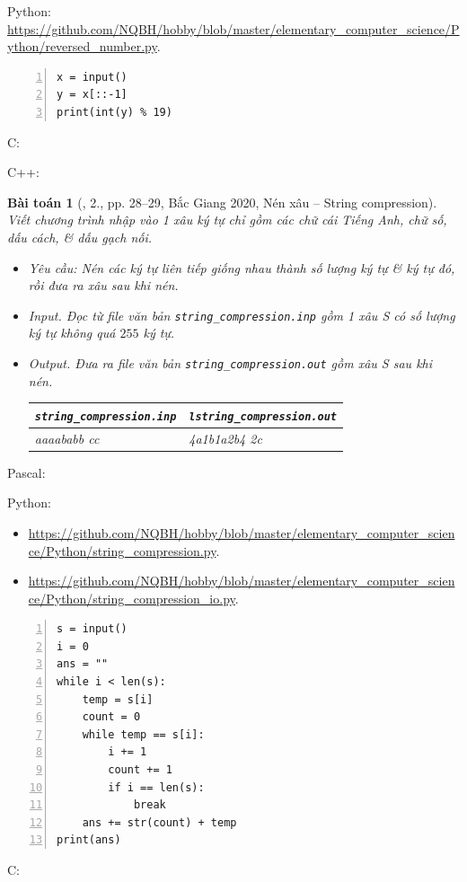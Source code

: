\documentclass{article}
\newtheorem{baitoan}{Bài toán}
\begin{document}
Python: \url{https://github.com/NQBH/hobby/blob/master/elementary_computer_science/Python/reversed_number.py}.
\begin{Verbatim}[numbers=left,xleftmargin=5mm]
x = input()
y = x[::-1]
print(int(y) % 19)
\end{Verbatim}
C:

C++:

\begin{baitoan}[\cite{VietSTEM2021}, 2., pp. 28--29, Bắc Giang 2020, Nén xâu -- String compression]
	Viết chương trình nhập vào 1 xâu ký tự chỉ gồm các chữ cái Tiếng Anh, chữ số, dấu cách, \& dấu gạch nối.
	\begin{itemize}
		\item {\sf Yêu cầu:} Nén các ký tự liên tiếp giống nhau thành số lượng ký tự \& ký tự đó, rồi đưa ra xâu sau khi nén.
		\item {\sf Input.} Đọc từ file văn bản \verb|string_compression.inp| gồm 1 xâu S có số lượng ký tự không quá $255$ ký tự.
		\item {\sf Output.} Đưa ra file văn bản \verb|string_compression.out| gồm xâu S sau khi nén.
		\begin{table}[H]
			\centering
			\begin{tabular}{|l|l|}
				\hline
				\verb|string_compression.inp| & \verb|lstring_compression.out| \\
				\hline
				aaaababb    cc & 4a1b1a2b4 2c \\
				\hline
			\end{tabular}
		\end{table}
	\end{itemize}
\end{baitoan}
\noindent Pascal:

Python:
\begin{itemize}
    \item \url{https://github.com/NQBH/hobby/blob/master/elementary_computer_science/Python/string_compression.py}.
    \item \url{https://github.com/NQBH/hobby/blob/master/elementary_computer_science/Python/string_compression_io.py}.
\end{itemize}
\begin{Verbatim}[numbers=left,xleftmargin=5mm]
s = input()
i = 0
ans = ""
while i < len(s):
    temp = s[i]
    count = 0
    while temp == s[i]:
        i += 1
        count += 1
        if i == len(s):
            break
    ans += str(count) + temp
print(ans)
\end{Verbatim}
C:
\end{document}
